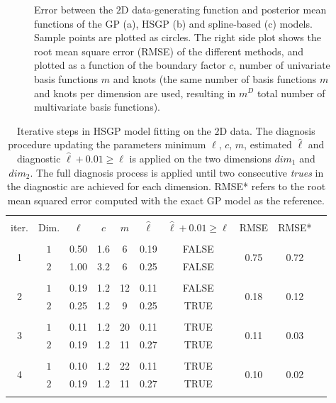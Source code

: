 \begin{figure}[h]
\caption{Error between the $2$D data-generating function and posterior mean functions of the GP (a), HSGP (b) and spline-based (c) models. Sample points are plotted as circles. The right side plot shows the root mean square error (RMSE) of the different methods, and plotted as a function of the boundary factor $c$, number of univariate basis functions $m$ and knots (the same number of basis functions $m$ and knots per dimension are used, resulting in $m^D$ total number of multivariate basis functions).}
  \label{ch5_fig16_errors_exII}
\end{figure}

\begin{table}
\centering
\setlength{\tabcolsep}{3.6pt}
\begin{tabular}{cccccccccc}
\arrayrulecolor{gray}\hline \\[-3mm]
 iter. & Dim. & $\ell$ & $c$ & $m$ & $\hat{\ell}$ & $\hat{\ell} + 0.01 \geq \ell$ & RMSE & RMSE* \\ 
\arrayrulecolor{lightgray}\hline \\[-2mm]
 \multirow{2}{*}{ 1 } & $1$ & 0.50 & 1.6 & 6 & 0.19 & FALSE & \multirow{2}{*}{ 0.75 } & \multirow{2}{*}{ 0.72 }\\ 
 & $2$ & 1.00 & 3.2 & 6 & 0.25 & FALSE &  &  \\
\arrayrulecolor{lightgray}\hline \\[-2mm]
 \multirow{2}{*}{ 2 } & $1$ & 0.19 & 1.2 & 12 & 0.11 & FALSE  & \multirow{2}{*}{ 0.18 } & \multirow{2}{*}{ 0.12 }\\
 & $2$ & 0.25 & 1.2 & 9 & 0.25 & TRUE &  &  \\
\arrayrulecolor{lightgray}\hline \\[-2mm]
 \multirow{2}{*}{ 3 } & $1$ & 0.11 & 1.2 & 20 & 0.11 & TRUE  & \multirow{2}{*}{ 0.11 } & \multirow{2}{*}{ 0.03 }\\
 & $2$ & 0.19 & 1.2 & 11 & 0.27 & TRUE &  &  \\
\arrayrulecolor{lightgray}\hline \\[-2mm]
 \multirow{2}{*}{ 4 } & $1$ & 0.10 & 1.2 & 22 & 0.11 & TRUE  & \multirow{2}{*}{ 0.10 } & \multirow{2}{*}{ 0.02 }\\
 & $2$ & 0.19 & 1.2 & 11 & 0.27 & TRUE  &  & \\[1mm] 
\arrayrulecolor{lightgray}\hline
 \multicolumn{8}{l}{ $\ell_{1_{GP}}=0.10$, \, $\ell_{2_{GP}}=0.29$ }
\end{tabular}
\caption{Iterative steps in HSGP model fitting on the $2$D data. The diagnosis procedure updating the parameters minimum $\ell$, $c$, $m$, estimated $\hat{\ell}$ and diagnostic $\hat{\ell} + 0.01 \geq \ell$ is applied on the two dimensions $dim_1$ and $dim_2$. The full diagnosis process is applied until two consecutive \textit{trues} in the diagnostic are achieved for each dimension. RMSE* refers to the root mean squared error computed with the exact GP model as the reference.}
  \label{tab_caseIII_2D}
\end{table}

